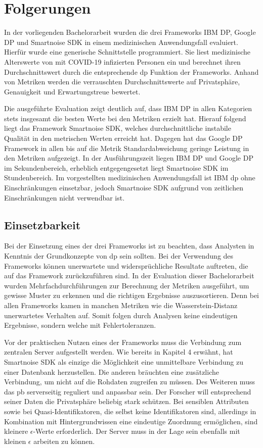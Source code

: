 \chapter{Folgerungen}
In der vorliegenden Bachelorarbeit wurden die drei Frameworks IBM DP, Google DP und Smartnoise SDK in einem medizinischen Anwendungsfall evaluiert. Hierfür wurde eine generische Schnittstelle programmiert. Sie liest medizinische Alterswerte von mit COVID-19 infizierten Personen ein und berechnet ihren Durchschnittswert durch die entsprechende \gls{dp} Funktion der Frameworks. Anhand von Metriken werden die verrauschten Durchschnittswerte auf Privatsphäre, Genauigkeit und Erwartungstreue bewertet.

Die ausgeführte Evaluation zeigt deutlich auf, dass IBM DP in allen Kategorien stets insgesamt die besten Werte bei den Metriken erzielt hat. Hierauf folgend liegt das Framework Smartnoise SDK, welches durchschnittliche instabile Qualität in den metrischen Werten erreicht hat. Dagegen hat das Google DP Framework in allen bis auf die Metrik Standardabweichung geringe Leistung in den Metriken aufgezeigt. In der Ausführungszeit liegen IBM DP und Google DP im Sekundenbereich, erheblich entgegengesetzt liegt Smartnoise SDK im Stundenbereich. Im vorgestellten medizinischen Anwendungsfall ist IBM \gls{dp} ohne Einschränkungen einsetzbar, jedoch Smartnoise SDK aufgrund von zeitlichen Einschränkungen nicht verwendbar ist.
\section{Einsetzbarkeit}
Bei der Einsetzung eines der drei Frameworks ist zu beachten, dass Analysten in Kenntnis der Grundkonzepte von \gls{dp} sein sollten. Bei der Verwendung des Frameworks können unerwartete und widersprüchliche Resultate auftreten, die auf das Framework zurückzuführen sind. In der Evaluation dieser Bachelorarbeit wurden Mehrfachdurchführungen zur Berechnung der Metriken ausgeführt, um gewisse Muster zu erkennen und die richtigen Ergebnisse auszusortieren. Denn bei allen Frameworks kamen in manchen Metriken wie die Wasserstein-Distanz unerwartetes Verhalten auf. Somit folgen durch Analysen keine eindeutigen Ergebnisse, sondern welche mit Fehlertoleranzen.

Vor der praktischen Nutzen eines der Frameworks muss die Verbindung zum zentralen Server aufgestellt werden. Wie bereits in Kapitel 4 erwähnt, hat Smartnoise SDK als einzige die Möglichkeit eine unmittelbare Verbindung zu einer Datenbank herzustellen. Die anderen bräuchten eine zusätzliche Verbindung, um nicht auf die Rohdaten zugreifen zu müssen. Des Weiteren muss das \gls{pb} serverseitig reguliert und anpassbar sein. Der Forscher will entsprechend seiner Daten die Privatsphäre beliebig stark schützen. Bei sensiblen Attributen sowie bei Quasi-Identifikatoren, die selbst keine Identifikatoren sind, allerdings in Kombination mit Hintergrundwissen eine eindeutige Zuordnung ermöglichen, sind kleinere $\epsilon$-Werte erforderlich. Der Server muss in der Lage sein ebenfalls mit kleinen $\epsilon$ arbeiten zu können.

